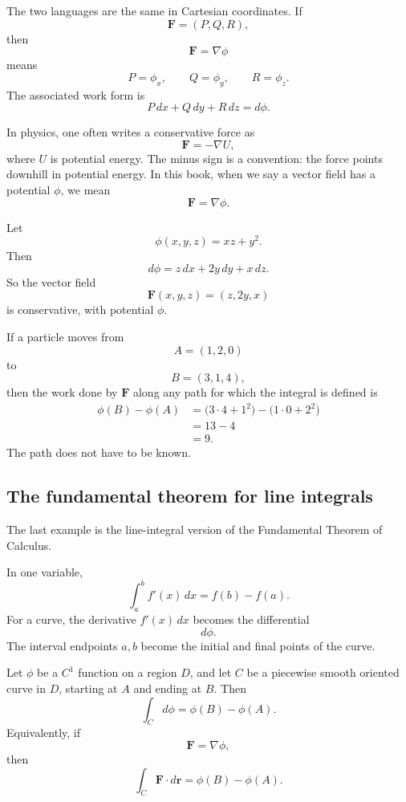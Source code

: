 The two languages are the same in Cartesian coordinates.  If
\[
    \mathbf F=(P,Q,R),
\]
then
\[
    \mathbf F=\nabla\phi
\]
means
\[
    P=\phi_x,\qquad Q=\phi_y,\qquad R=\phi_z.
\]
The associated work form is
\[
    P\,dx+Q\,dy+R\,dz=d\phi.
\]

In physics, one often writes a conservative force as
\[
    \mathbf F=-\nabla U,
\]
where \(U\) is potential energy.  The minus sign is a convention: the force points
downhill in potential energy.  In this book, when we say a vector field has a potential
\(\phi\), we mean
\[
    \mathbf F=\nabla\phi.
\]

\begin{example}
Let
\[
    \phi(x,y,z)=xz+y^2.
\]
Then
\[
    d\phi=z\,dx+2y\,dy+x\,dz.
\]
So the vector field
\[
    \mathbf F(x,y,z)=(z,2y,x)
\]
is conservative, with potential \(\phi\).

If a particle moves from
\[
    A=(1,2,0)
\]
to
\[
    B=(3,1,4),
\]
then the work done by \(\mathbf F\) along any path for which the integral is defined is
\[
\begin{aligned}
\phi(B)-\phi(A)
&=
\bigl(3\cdot4+1^2\bigr)-\bigl(1\cdot0+2^2\bigr)\\
&=
13-4\\
&=
9.
\end{aligned}
\]
The path does not have to be known.
\end{example}

\subsection{The fundamental theorem for line integrals}

The last example is the line-integral version of the Fundamental Theorem of Calculus.

In one variable,
\[
    \int_a^b f'(x)\,dx=f(b)-f(a).
\]
For a curve, the derivative \(f'(x)\,dx\) becomes the differential
\[
    d\phi.
\]
The interval endpoints \(a,b\) become the initial and final points of the curve.

\begin{theorem}
Let \(\phi\) be a \(C^1\) function on a region \(D\), and let \(C\) be a piecewise smooth
oriented curve in \(D\), starting at \(A\) and ending at \(B\).  Then
\[
\boxed{
    \int_C d\phi=\phi(B)-\phi(A).
}
\]
Equivalently, if
\[
    \mathbf F=\nabla\phi,
\]
then
\[
\boxed{
    \int_C \mathbf F\cdot d\mathbf r=\phi(B)-\phi(A).
}
\]
\end{theorem}

